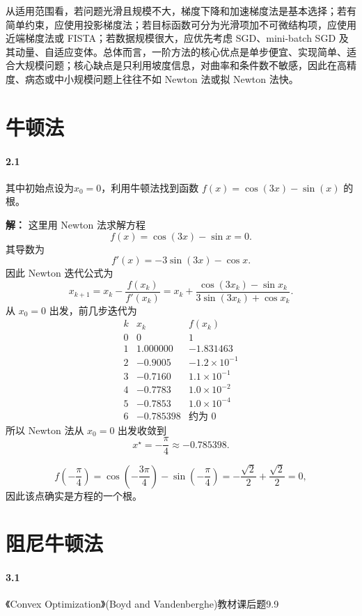 \documentclass[12pt,a4paper]{article}
\begin{document}
从适用范围看，若问题光滑且规模不大，梯度下降和加速梯度法是基本选择；若有简单约束，应使用投影梯度法；若目标函数可分为光滑项加不可微结构项，应使用近端梯度法或 FISTA；若数据规模很大，应优先考虑 SGD、mini-batch SGD 及其动量、自适应变体。总体而言，一阶方法的核心优点是单步便宜、实现简单、适合大规模问题；核心缺点是只利用坡度信息，对曲率和条件数不敏感，因此在高精度、病态或中小规模问题上往往不如 Newton 法或拟 Newton 法快。


\section{牛顿法}

\paragraph{2.1}
其中初始点设为$x_0=0$，利用牛顿法找到函数 $f(x)=\cos(3x)-\sin(x)$ 的根。

\textbf{解：}
这里用 Newton 法求解方程
\[
  f(x)=\cos(3x)-\sin x=0.
\]
其导数为
\[
  f'(x)=-3\sin(3x)-\cos x.
\]
因此 Newton 迭代公式为
\[
  x_{k+1}
  =
  x_k-\frac{f(x_k)}{f'(x_k)}
  =
  x_k+
  \frac{\cos(3x_k)-\sin x_k}
  {3\sin(3x_k)+\cos x_k}.
\]
从 $x_0=0$ 出发，前几步迭代为
\[
\begin{array}{c|c|c}
k & x_k & f(x_k)\\
\hline
0 & 0 & 1\\
1 & 1.000000 & -1.831463\\
2 & -0.9005 & -1.2\times 10^{-1}\\
3 & -0.7160 & 1.1\times 10^{-1}\\
4 & -0.7783 & 1.0\times 10^{-2}\\
5 & -0.7853 & 1.0\times 10^{-4}\\
6 & -0.785398 & \text{约为 }0
\end{array}
\]
所以 Newton 法从 $x_0=0$ 出发收敛到
\[
  \boxed{x^\star=-\frac{\pi}{4}\approx -0.785398}.
\]

\[
  f\left(-\frac{\pi}{4}\right)
  =
  \cos\left(-\frac{3\pi}{4}\right)
  -\sin\left(-\frac{\pi}{4}\right)
  =
  -\frac{\sqrt2}{2}+\frac{\sqrt2}{2}=0,
\]
因此该点确实是方程的一个根。


\section{阻尼牛顿法}
\paragraph{3.1}《Convex Optimization》(Boyd and Vandenberghe)教材课后题9.9
\end{document}
